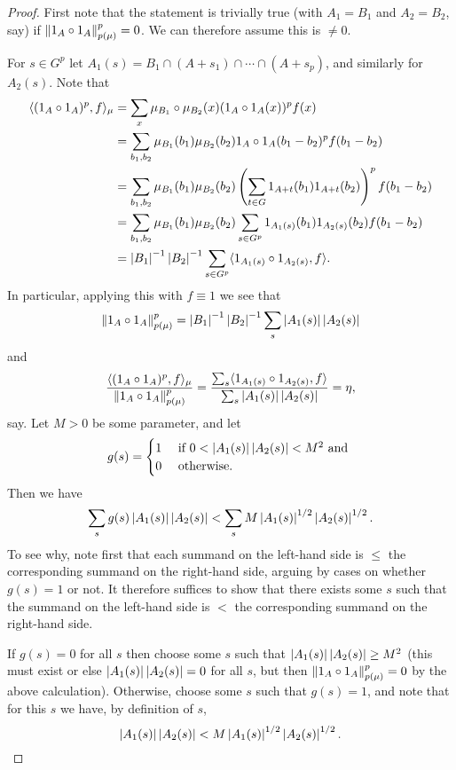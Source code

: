 \begin{proof}
First note that the statement is trivially true (with $A_1=B_1$ and $A_2=B_2$, say) if $\lVert 1_{A}\circ 1_{A}\rVert_{p(\mu)}^p=0$. We can therefore assume this is $\neq 0$. 

For $s\in G^{p}$ let $A_1(s)=B_1\cap (A+s_1)\cap\cdots\cap (A+s_{p})$, and similarly for $A_2(s)$. Note that
\begin{align*}
\langle (1_{A}\circ 1_{A})^p, f\rangle_\mu
&=\sum_{x} \mu_{B_1}\circ \mu_{B_2}(x)(1_{A}\circ 1_{A}(x))^pf(x)\\
&=\sum_{b_1,b_2}\mu_{B_1}(b_1)\mu_{B_2}(b_2)1_{A}\circ 1_{A}(b_1-b_2)^{p}f(b_1-b_2)\\
&=\sum_{b_1,b_2}\mu_{B_1}(b_1)\mu_{B_2}(b_2)\left( \sum_{t\in G}1_{A+t}(b_1)1_{A+t}(b_2)\right)^{p}f(b_1-b_2)\\
&=\sum_{b_1,b_2}\mu_{B_1}(b_1)\mu_{B_2}(b_2)\sum_{s\in G^p}1_{A_1(s)}(b_1)1_{A_2(s)}(b_2)f(b_1-b_2)\\
&=\left\lvert B_1\right\rvert^{-1}\left\lvert B_2\right\rvert^{-1}\sum_{s\in G^p}\langle 1_{A_1(s)}\circ 1_{A_2(s)}, f\rangle.
\end{align*}
In particular, applying this with $f\equiv 1$ we see that
\[\lVert 1_{A}\circ 1_{A}\rVert_{p(\mu)}^p=\left\lvert B_1\right\rvert^{-1}\left\lvert B_2\right\rvert^{-1}\sum_s\left\lvert A_1(s)\right\rvert\left\lvert A_2(s)\right\rvert\]
and
\[\frac{\langle (1_{A}\circ 1_{A})^p,f\rangle_\mu}{\lVert 1_{A}\circ 1_{A}\rVert_{p(\mu)}^p}=\frac{\sum_{s}\langle 1_{A_1(s)}\circ 1_{A_2(s)}, f\rangle}{\sum_s \left\lvert A_1(s)\right\rvert\left\lvert A_2(s)\right\rvert}=\eta,\]
say. Let $M>0$ be some parameter, and let 
\[g(s) = \begin{cases} 1&\textrm{ if }0<\left\lvert A_1(s)\right\rvert\left\lvert A_2(s)\right\rvert<M^2\textrm{ and }\\0&\textrm{ otherwise.}\end{cases}\]
Then we have 
\[\sum_s g(s)\left\lvert A_1(s)\right\rvert\left\lvert A_2(s)\right\rvert
<\sum_s M\left\lvert A_1(s)\right\rvert^{1/2}\left\lvert A_2(s)\right\rvert^{1/2}.\]
To see why, note first that each summand on the left-hand side is $\leq$ the corresponding summand on the right-hand side, arguing by cases on whether $g(s)=1$ or not. It therefore suffices to show that there exists some $s$ such that the summand on the left-hand side is $<$ the corresponding summand on the right-hand side. 

If $g(s)=0$ for all $s$ then choose some $s$ such that $\left\lvert A_1(s)\right\rvert\left\lvert A_2(s)\right\rvert\geq M^2$ (this must exist or else $\left\lvert A_1(s)\right\rvert\left\lvert A_2(s)\right\rvert=0$ for all $s$, but then $\lVert 1_A\circ 1_A\rVert_{p(\mu)}^p=0$ by the above calculation). Otherwise, choose some $s$ such that $g(s)=1$, and note that for this $s$ we have, by definition of $s$,
\[\left\lvert A_1(s)\right\rvert\left\lvert A_2(s)\right\rvert<M\left\lvert A_1(s)\right\rvert^{1/2}\left\lvert A_2(s)\right\rvert^{1/2}.\]


\end{proof}
